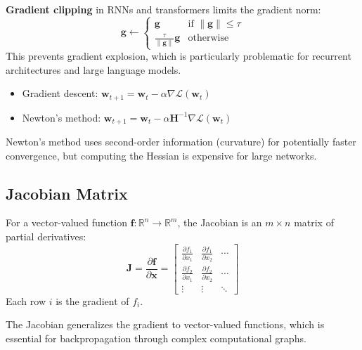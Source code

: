 \textbf{Gradient clipping} in RNNs and transformers limits the gradient norm:
\begin{equation}
\mathbf{g} \leftarrow \begin{cases}
\mathbf{g} & \text{if } \|\mathbf{g}\| \leq \tau \\
\frac{\tau}{\|\mathbf{g}\|} \mathbf{g} & \text{otherwise}
\end{cases}
\end{equation}
This prevents gradient explosion, which is particularly problematic for recurrent architectures and large language models.

\begin{example}
\begin{itemize}
    \item Gradient descent: $\mathbf{w}_{t+1} = \mathbf{w}_t - \alpha \nabla \mathcal{L}(\mathbf{w}_t)$
    \item Newton's method: $\mathbf{w}_{t+1} = \mathbf{w}_t - \alpha \mathbf{H}^{-1} \nabla \mathcal{L}(\mathbf{w}_t)$
\end{itemize}
Newton's method uses second-order information (curvature) for potentially faster convergence, but computing the Hessian is expensive for large networks.
\end{example}

\subsection{Jacobian Matrix}

\begin{definition}[Jacobian]
For a vector-valued function $\mathbf{f}: \mathbb{R}^n \to \mathbb{R}^m$, the Jacobian is an $m \times n$ matrix of partial derivatives:
\begin{equation}
\mathbf{J} = \frac{\partial \mathbf{f}}{\partial \mathbf{x}} = \begin{bmatrix}
\frac{\partial f_1}{\partial x_1} & \frac{\partial f_1}{\partial x_2} & \cdots \\
\frac{\partial f_2}{\partial x_1} & \frac{\partial f_2}{\partial x_2} & \cdots \\
\vdots & \vdots & \ddots
\end{bmatrix}
\end{equation}
Each row $i$ is the gradient of $f_i$.
\end{definition}

The Jacobian generalizes the gradient to vector-valued functions, which is essential for backpropagation through complex computational graphs.

